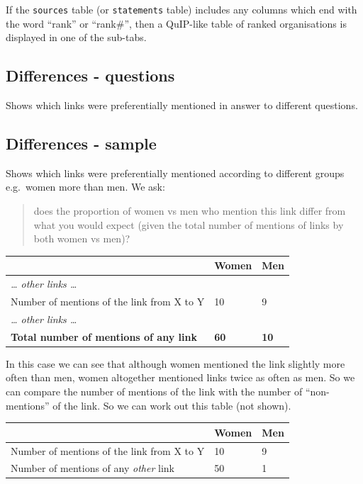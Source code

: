 \documentclass[
]{book}
\begin{document}
If the \texttt{sources} table (or \texttt{statements} table) includes any columns which end with the word ``rank'' or ``rank\#'', then a QuIP-like table of ranked organisations is displayed in one of the sub-tabs.

\hypertarget{differences---questions}{%
\subsection{Differences - questions}\label{differences---questions}}

Shows which links were preferentially mentioned in answer to different questions.

\hypertarget{differences---sample}{%
\subsection{Differences - sample}\label{differences---sample}}

Shows which links were preferentially mentioned according to different groups e.g.~women more than men. We ask:

\begin{quote}
does the proportion of women vs men who mention this link differ from what you would expect (given the total number of mentions of links by both women vs men)?
\end{quote}

\begin{longtable}[]{@{}lll@{}}
\toprule
& Women & Men \\
\midrule
\endhead
\emph{\ldots{} other links \ldots{}} & & \\
Number of mentions of the link from X to Y & 10 & 9 \\
\emph{\ldots{} other links \ldots{}} & & \\
\textbf{Total number of mentions of any link} & \textbf{60} & \textbf{10} \\
\bottomrule
\end{longtable}

In this case we can see that although women mentioned the link slightly more often than men, women altogether mentioned links twice as often as men. So we can compare the number of mentions of the link with the number of ``non-mentions'' of the link. So we can work out this table (not shown).

\begin{longtable}[]{@{}lll@{}}
\toprule
& Women & Men \\
\midrule
\endhead
Number of mentions of the link from X to Y & 10 & 9 \\
Number of mentions of any \emph{other} link & 50 & 1 \\
\bottomrule
\end{longtable}
\end{document}
